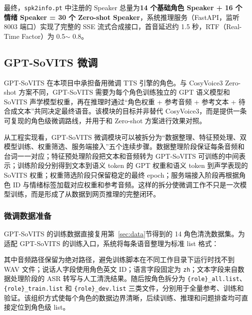 \documentclass[12pt,a4paper]{article}
\begin{document}
最终，\texttt{spk2info.pt} 中注册的 Speaker 总量为\textbf{14 个基础角色 Speaker + 16 个情绪 Speaker = 30 个 Zero-shot Speaker}，系统推理服务（FastAPI，监听 8003 端口）实现了完整的 SSE 流式合成接口，首音延迟约 1.5 秒，RTF（Real-Time Factor）为 0.5$\sim$ 0.8。

\subsection{GPT-SoVITS 微调}
\label{sec:gptsovits}

GPT-SoVITS\cite{gptsovits} 在本项目中承担备用微调 TTS 引擎的角色。与 CosyVoice3 Zero-shot 方案不同，GPT-SoVITS 需要为每个角色训练独立的 GPT 语义模型和 SoVITS 声学模型权重，再在推理时通过“角色权重 + 参考音频 + 参考文本 + 待合成文本”共同决定最终语音。该模块的目标并非替代 CosyVoice3，而是提供一条可复现的角色级微调路线，并用于和 Zero-shot 方案进行效果对照。

从工程实现看，GPT-SoVITS 微调模块可以被拆分为“数据整理、特征预处理、双模型训练、权重筛选、服务端接入”五个连续步骤。数据整理阶段保证每条音频和台词一一对应；特征预处理阶段把文本和音频转为 GPT-SoVITS 可训练的中间表示；训练阶段分别得到文本到语义 token 的 GPT 权重和语义 token 到声学表现的 SoVITS 权重；权重筛选阶段只保留稳定的最终 epoch；服务端接入阶段再根据角色 ID 与情绪标签加载对应权重和参考音频。这样的拆分使微调工作不只是一次模型训练，而是形成了从数据到网页推理的完整闭环。

\subsubsection{微调数据准备}

GPT-SoVITS 的训练数据直接复用第~\ref{sec:data}节得到的 14 角色清洗数据集。为适配 GPT-SoVITS 的训练入口，系统将每条语音整理为标准 list 格式：

\begin{center}
\end{center}

其中音频路径保留为绝对路径，避免训练脚本在不同工作目录下运行时找不到 WAV 文件；说话人字段使用角色英文 ID；语言字段固定为 \texttt{zh}；文本字段来自数据处理阶段的 ASR 转写与人工清洗结果。随后按角色拆分为 \texttt{\{role\}\_all.list}、\texttt{\{role\}\_train.list} 和 \texttt{\{role\}\_dev.list} 三类文件，分别用于全量参考、训练和验证。该组织方式使每个角色的数据边界清晰，后续训练、推理和问题排查均可直接定位到角色级 list。
\end{document}
